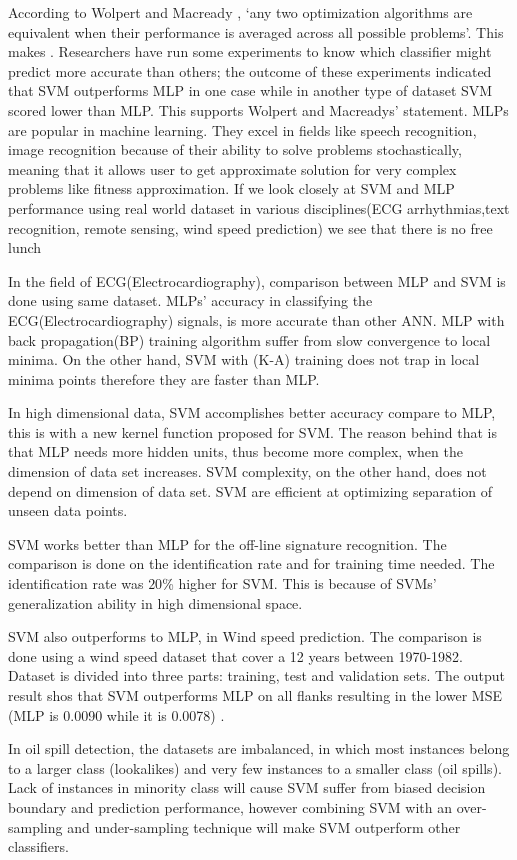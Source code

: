 According to Wolpert and Macready \cite{wolpert1995no}, `any two optimization algorithms are equivalent when their performance is averaged across all possible problems'. This makes .  
Researchers \cite{Moavenian20103088,Zanaty2012177} have run some experiments to know which classifier might predict more accurate than others; the outcome of these experiments indicated that SVM outperforms MLP in one case while in another type of dataset SVM scored lower than MLP. This supports Wolpert and Macreadys' statement. 
MLPs are popular in machine learning. They excel in fields like speech recognition, image recognition because of their ability to solve problems stochastically, meaning that it allows user to get approximate solution for very complex problems like fitness approximation\cite{jin2005neural}. If we look closely at SVM and MLP performance using real world dataset in various disciplines(ECG arrhythmias,text recognition, remote sensing, wind speed prediction) we see that there is no free lunch \cite{wolpert1995no}

In the field of ECG(Electrocardiography), comparison between MLP and SVM is done using same dataset. MLPs' accuracy in classifying the ECG(Electrocardiography) signals, is more accurate than other ANN. MLP with back propagation(BP) training algorithm suffer from slow convergence to local minima. On the other hand, SVM with (K-A) training does not trap in local minima points therefore they are faster than MLP\cite{Moavenian20103088}.

In high dimensional data, SVM accomplishes better accuracy compare to MLP, this is with a new kernel function proposed for SVM. The reason behind that is that MLP needs more hidden units, thus become more complex, when the dimension of data set increases. SVM complexity, on the other hand, does not depend on dimension of data set. SVM are efficient at optimizing separation of unseen data points\cite{Zanaty2012177}.

SVM works better than MLP for the off-line signature recognition. The comparison is done on the identification rate and for training time needed. The identification rate was $20$\% higher for SVM. This is because of SVMs' generalization ability in high dimensional space\cite{FriasMartinez2006693}.

SVM also outperforms to MLP, in Wind speed prediction. The comparison is done using a wind speed dataset that cover a 12 years between 1970-1982. Dataset is divided into three parts: training, test and validation sets. The output result shos that SVM outperforms MLP on all flanks resulting in the lower MSE (MLP is 0.0090 while it is 0.0078) \cite{Mohandes2004939}.

In oil spill detection, the datasets are imbalanced, in which most instances belong to a larger class (lookalikes) and very few instances to a smaller class (oil spills). Lack of instances in minority class will cause SVM suffer from biased decision boundary and prediction performance, however combining SVM with an over-sampling and under-sampling technique will make SVM outperform other classifiers\cite{liu2006boosting}.
